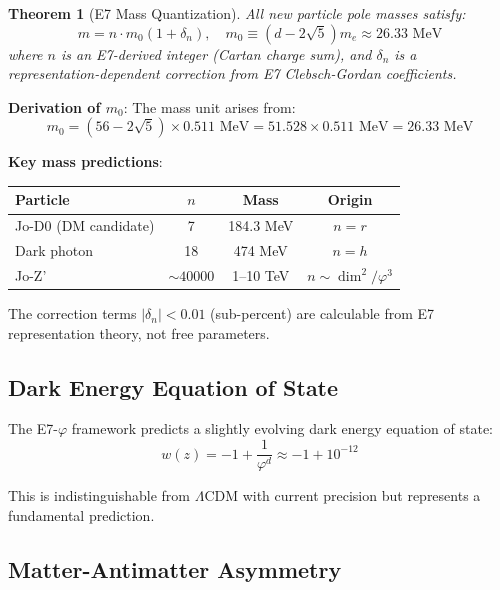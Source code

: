 \documentclass[11pt,a4paper]{article}
\newtheorem{theorem}{Theorem}
\begin{document}
\begin{theorem}[E7 Mass Quantization]
All new particle pole masses satisfy:
\begin{equation}
m = n \cdot m_0 (1 + \delta_n), \quad m_0 \equiv (d - 2\sqrt{5}) m_e \approx 26.33 \text{ MeV}
\end{equation}
where $n$ is an E7-derived integer (Cartan charge sum), and $\delta_n$ is a representation-dependent correction from E7 Clebsch-Gordan coefficients.
\end{theorem}

\textbf{Derivation of $m_0$}: The mass unit arises from:
\begin{equation}
m_0 = (56 - 2\sqrt{5}) \times 0.511 \text{ MeV} = 51.528 \times 0.511 \text{ MeV} = 26.33 \text{ MeV}
\end{equation}

\textbf{Key mass predictions}:
\begin{center}
\begin{tabular}{|l|c|c|c|}
\hline
\textbf{Particle} & $n$ & \textbf{Mass} & \textbf{Origin} \\
\hline
Jo-D0 (DM candidate) & 7 & 184.3 MeV & $n = r$ \\
Dark photon & 18 & 474 MeV & $n = h$ \\
Jo-Z' & $\sim 40000$ & 1--10 TeV & $n \sim \dim^2/\varphi^3$ \\
\hline
\end{tabular}
\end{center}

The correction terms $|\delta_n| < 0.01$ (sub-percent) are calculable from E7 representation theory, not free parameters.

\subsection{Dark Energy Equation of State}

The E7-$\varphi$ framework predicts a slightly evolving dark energy equation of state:
\begin{equation}
w(z) = -1 + \frac{1}{\varphi^{d}} \approx -1 + 10^{-12}
\end{equation}

This is indistinguishable from $\Lambda$CDM with current precision but represents a fundamental prediction.

\subsection{Matter-Antimatter Asymmetry}
\end{document}
